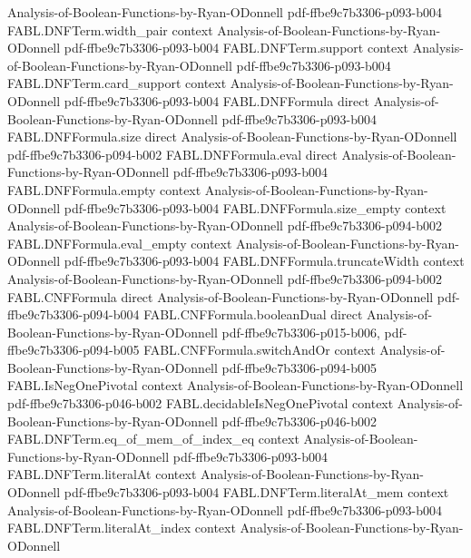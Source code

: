 \begin{theorem}
  {Analysis-of-Boolean-Functions-by-Ryan-ODonnell}
  {pdf-ffbe9c7b3306-p093-b004}
\proofstep
  {FABL.DNFTerm.width_pair}
  {context}
  {Analysis-of-Boolean-Functions-by-Ryan-ODonnell}
  {pdf-ffbe9c7b3306-p093-b004}
\proofstep
  {FABL.DNFTerm.support}
  {context}
  {Analysis-of-Boolean-Functions-by-Ryan-ODonnell}
  {pdf-ffbe9c7b3306-p093-b004}
\proofstep
  {FABL.DNFTerm.card_support}
  {context}
  {Analysis-of-Boolean-Functions-by-Ryan-ODonnell}
  {pdf-ffbe9c7b3306-p093-b004}
\proofstep
  {FABL.DNFFormula}
  {direct}
  {Analysis-of-Boolean-Functions-by-Ryan-ODonnell}
  {pdf-ffbe9c7b3306-p093-b004}
\proofstep
  {FABL.DNFFormula.size}
  {direct}
  {Analysis-of-Boolean-Functions-by-Ryan-ODonnell}
  {pdf-ffbe9c7b3306-p094-b002}
\proofstep
  {FABL.DNFFormula.eval}
  {direct}
  {Analysis-of-Boolean-Functions-by-Ryan-ODonnell}
  {pdf-ffbe9c7b3306-p093-b004}
\proofstep
  {FABL.DNFFormula.empty}
  {context}
  {Analysis-of-Boolean-Functions-by-Ryan-ODonnell}
  {pdf-ffbe9c7b3306-p093-b004}
\proofstep
  {FABL.DNFFormula.size_empty}
  {context}
  {Analysis-of-Boolean-Functions-by-Ryan-ODonnell}
  {pdf-ffbe9c7b3306-p094-b002}
\proofstep
  {FABL.DNFFormula.eval_empty}
  {context}
  {Analysis-of-Boolean-Functions-by-Ryan-ODonnell}
  {pdf-ffbe9c7b3306-p093-b004}
\proofstep
  {FABL.DNFFormula.truncateWidth}
  {context}
  {Analysis-of-Boolean-Functions-by-Ryan-ODonnell}
  {pdf-ffbe9c7b3306-p094-b002}
\proofstep
  {FABL.CNFFormula}
  {direct}
  {Analysis-of-Boolean-Functions-by-Ryan-ODonnell}
  {pdf-ffbe9c7b3306-p094-b004}
\proofstep
  {FABL.CNFFormula.booleanDual}
  {direct}
  {Analysis-of-Boolean-Functions-by-Ryan-ODonnell}
  {pdf-ffbe9c7b3306-p015-b006,
    pdf-ffbe9c7b3306-p094-b005}
\proofstep
  {FABL.CNFFormula.switchAndOr}
  {context}
  {Analysis-of-Boolean-Functions-by-Ryan-ODonnell}
  {pdf-ffbe9c7b3306-p094-b005}
\proofstep
  {FABL.IsNegOnePivotal}
  {context}
  {Analysis-of-Boolean-Functions-by-Ryan-ODonnell}
  {pdf-ffbe9c7b3306-p046-b002}
\proofstep
  {FABL.decidableIsNegOnePivotal}
  {context}
  {Analysis-of-Boolean-Functions-by-Ryan-ODonnell}
  {pdf-ffbe9c7b3306-p046-b002}
\proofstep
  {FABL.DNFTerm.eq_of_mem_of_index_eq}
  {context}
  {Analysis-of-Boolean-Functions-by-Ryan-ODonnell}
  {pdf-ffbe9c7b3306-p093-b004}
\proofstep
  {FABL.DNFTerm.literalAt}
  {context}
  {Analysis-of-Boolean-Functions-by-Ryan-ODonnell}
  {pdf-ffbe9c7b3306-p093-b004}
\proofstep
  {FABL.DNFTerm.literalAt_mem}
  {context}
  {Analysis-of-Boolean-Functions-by-Ryan-ODonnell}
  {pdf-ffbe9c7b3306-p093-b004}
\proofstep
  {FABL.DNFTerm.literalAt_index}
  {context}
  {Analysis-of-Boolean-Functions-by-Ryan-ODonnell}

\end{theorem}
